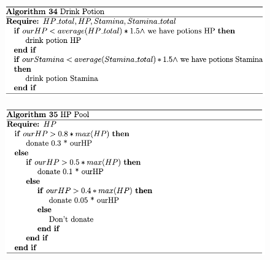 
\begin{figure}[htb]
    \centering
    \includegraphics[scale=0.7]{006_team_3_agent_design/FIGS/Algo34.png}
    \label{fig:algo34}
\end{figure}



\begin{figure}[htb]
    \centering
    \includegraphics[scale=0.7]{006_team_3_agent_design/FIGS/Algo35.png}
    \label{fig:algo35}
\end{figure}

